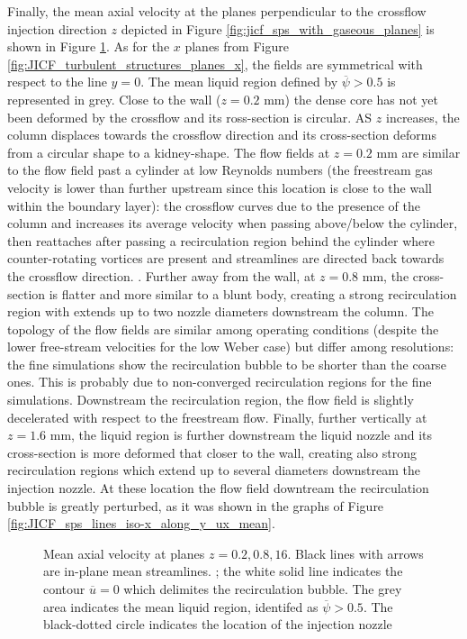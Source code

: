 Finally, the mean axial velocity at the planes perpendicular to the crossflow injection direction $z$ depicted in Figure \ref{fig:jicf_sps_with_gaseous_planes} is shown in Figure \ref{fig:JICF_turbulent_structures_planes_z}. As for the $x$ planes from Figure \ref{fig:JICF_turbulent_structures_planes_x}, the fields are symmetrical with respect to the line $y = 0$. The mean liquid region defined by $\overline{\psi} > 0.5$ is represented in grey. Close to the wall ($z = 0.2$ mm) the dense core has not yet been deformed by the crossflow and its ross-section is circular. AS $z$ increases, the column displaces towards the crossflow direction and its cross-section deforms from a circular shape to a kidney-shape. The flow fields at $z = 0.2$ mm are similar to the flow field past a cylinder at low Reynolds numbers (the freestream gas velocity is lower than further upstream since this location is close to the wall within the boundary layer): the crossflow curves due to the presence of the column and increases its average velocity when passing above/below the cylinder, then reattaches after passing a recirculation region behind the cylinder where counter-rotating vortices are present and streamlines are directed back towards the crossflow direction. . Further away from the wall, at $z = 0.8$ mm, the cross-section is flatter and more similar to a blunt body, creating a strong recirculation region with extends up to two nozzle diameters downstream the column. The topology of the flow fields are similar among operating conditions (despite the lower free-stream velocities for the low Weber case) but differ among resolutions: the fine simulations show the recirculation bubble to be shorter than the coarse ones. This is probably due to non-converged recirculation regions for the fine simulations. Downstream the recirculation region, the flow field is slightly decelerated with respect to the freestream flow. Finally, further vertically at $z = 1.6$ mm, the liquid region is further downstream the liquid nozzle and its cross-section is more deformed that closer to the wall, creating also strong recirculation regions which extend up to several diameters downstream the injection nozzle. At these location the flow field downtream the recirculation bubble is greatly perturbed, as it was shown in the graphs of Figure \ref{fig:JICF_sps_lines_iso-x_along_y_ux_mean}.

\begin{figure}[ht]
\centering
\caption[Mean axial velocity at planes $z = 0.2, 0.8, 16$ mm]{Mean axial velocity at planes $z = 0.2, 0.8, 16$. Black lines with arrows are in-plane mean streamlines. ; the white solid line indicates the contour $\overline{u} = 0$ which delimites the recirculation bubble. The grey area  indicates the mean liquid region, identifed as $\overline{\psi} > 0.5$. The black-dotted circle indicates the location of the injection nozzle}
\label{fig:JICF_turbulent_structures_planes_z}
\end{figure}



